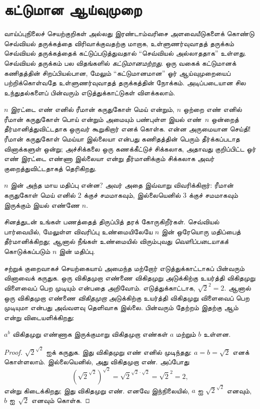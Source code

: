 \documentclass[../../../include/open-logic-chapter]{subfiles}
\begin{document}

\section{கட்டுமான ஆய்வுமுறை}

வாய்ப்புநிலைச் செயற்குறிகள் அல்லது இரண்டாம்வரிசை அளவையீடுகளைக் கொண்டு
செவ்வியல் தருக்கத்தை விரிவாக்குவதற்கு மாறாக, உள்ளுணர்வுவாதத் தருக்கம்
செவ்வியல் தருக்கத்தைக் கட்டுப்படுத்துவதால் ``செவ்வியல் அல்லாததாக'' உள்ளது.
செவ்வியல் தருக்கம் பல விதங்களில் \emph{கட்டுமானமற்றது}. ஒரு வகைக் கட்டுமானக்
கணிதத்தின் சிறப்பியல்பான, மேலும் ``கட்டுமானமான'' ஓர் ஆய்வுமுறையைப்
பற்றிக்கொள்வதே உள்ளுணர்வுவாதத் தருக்கத்தின் நோக்கம். அடிப்படையான சில
உந்துதல்களைப் பின்வரும் எடுத்துக்காட்டுகள் விளக்கலாம்.

$n$ இரட்டை எண் எனில் ரீமான் கருதுகோள் மெய் என்றும், $n$ ஒற்றை எண் எனில்
ரீமான் கருதுகோள் பொய் என்றும் அமையும் பண்புள்ள இயல் எண்~$n$ ஒன்றைத்
தீர்மானித்துவிட்டதாக ஒருவர் கூறுகிறார் எனக் கொள்க. என்ன அருமையான செய்தி!{}
ரீமான் கருதுகோள் மெய்யா இல்லையா என்பது கணிதத்தின் பெரும் தீர்க்கப்படாத
வினாக்களுள் ஒன்று; அச்சிக்கலை ஒரு கணக்கீட்டுச் சிக்கலாக, அதாவது குறிப்பிட்ட
ஓர் எண் இரட்டை எண்ணா இல்லையா என்று தீர்மானிக்கும் சிக்கலாக அவர்
குறைத்துவிட்டதாகத் தெரிகிறது.

$n$ இன் அந்த மாய மதிப்பு என்ன? அவர் அதை இவ்வாறு விவரிக்கிறார்: ரீமான்
கருதுகோள் மெய் எனில் $2$ க்குச் சமமாகவும், இல்லையெனில் $3$ க்குச் சமமாகவும்
இருக்கும் இயல் எண்ணே $n$.

சினத்துடன் உங்கள் பணத்தைத் திருப்பித் தரக் கோருகிறீர்கள். செவ்வியல்
பார்வையில், மேலுள்ள விவரிப்பு உண்மையிலேயே $n$ இன் ஒரேயொரு மதிப்பைத்
தீர்மானிக்கிறது; ஆனால் நீங்கள் உண்மையில் விரும்புவது \emph{வெளிப்படையாகக்}
கொடுக்கப்படும் $n$ இன் மதிப்பு.

சற்றுக் குறைவாகச் செயற்கையாய் அமைந்த மற்றோர் எடுத்துக்காட்டாகப் பின்வரும்
வினாவைக் கருதுக. ஒரு விகிதமுறா எண்ணை விகிதமுறு அடுக்கிற்கு உயர்த்தி
விகிதமுறு விளைவைப் பெற முடியும் என்பதை அறிவோம். எடுத்துக்காட்டாக,
$\sqrt{2}^2 = 2$. ஆனால் ஒரு விகிதமுறா எண்ணை \emph{விகிதமுறா}
அடுக்கிற்கு உயர்த்தி விகிதமுறு விளைவைப் பெற முடியுமா என்பது அவ்வளவு
தெளிவாக இல்லை. பின்வரும் தேற்றம் இதற்கு ஆம் என்று விடையளிக்கிறது:

\begin{thm}
$a^b$ விகிதமுறு எண்ணாக இருக்குமாறு விகிதமுறா எண்கள் $a$ மற்றும் $b$
உள்ளன.
\end{thm}

\begin{proof}
$\sqrt{2}^{\sqrt{2}}$ ஐக் கருதுக. இது விகிதமுறு எண் எனில் முடிந்தது:
$a = b = \sqrt{2}$ எனக் கொள்ளலாம். இல்லையெனில், அது விகிதமுறா எண்.
அப்போது
\[
(\sqrt{2}^{\sqrt{2}})^{\sqrt{2}} = \sqrt{2}^{\sqrt{2} \cdot
  \sqrt{2}} = \sqrt{2}^2 = 2,
\]
என்று கிடைக்கிறது; இது விகிதமுறு எண். எனவே இந்நிலையில், $a$ ஐ
$\sqrt{2}^{\sqrt{2}}$ எனவும், $b$ ஐ~$\sqrt 2$ எனவும் கொள்க.
\end{proof}
\end{document}
